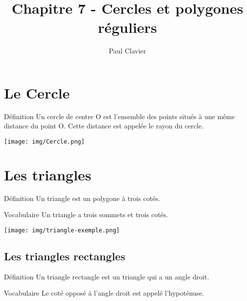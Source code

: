 \documentclass[12pt,a4paper]{article}
\author{Paul Clavier}
\title{Chapitre 7 - Cercles et polygones réguliers}
\begin{document}
\renewcommand\thesection{\Roman{section}}
\renewcommand\thesubsection{\arabic{subsection}}


\ifdefined\isprof
	\TeacherModeOn
\fi




\begin{center}
\end{center}

\section{Le Cercle}
\begin{definition}{Définition}
Un cercle de centre O est l'ensemble des points situés à une même distance du point O. Cette distance est appelée le rayon du cercle.
\end{definition}

\texttt{[image: img/Cercle.png]} 

\section{Les triangles}

\begin{minipage}{0.5\textwidth}
\begin{definition}{Définition}
Un triangle est un polygone à trois cotés.
\end{definition}
\end{minipage}
\begin{minipage}{0.5\textwidth}
\begin{definition}{Vocabulaire}
Un triangle a trois sommets et trois cotés.
\end{definition}
\end{minipage}

\texttt{[image: img/triangle-exemple.png]} 

\subsection{Les triangles rectangles}

\begin{minipage}{0.5\textwidth}
\begin{definition}{Définition}
Un triangle rectangle est un triangle qui a un angle droit.
\end{definition}
\end{minipage}
\begin{minipage}{0.5\textwidth}
\begin{definition}{Vocabulaire}
Le coté opposé à l'angle droit est appelé l'hypoténuse.
\end{definition}
\end{minipage}
\end{document}
